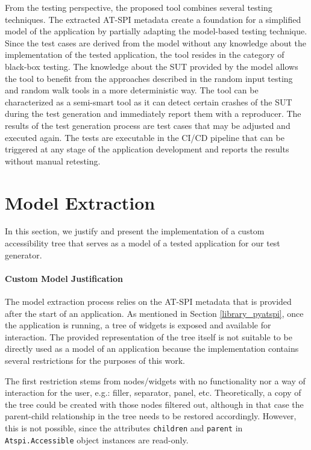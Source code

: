 From the testing perspective, the proposed tool combines several testing techniques. The extracted AT-SPI metadata create a foundation for a simplified model of the application by partially adapting the model-based testing technique. Since the test cases are derived from the model without any knowledge about the implementation of the tested application, the tool resides in the category of black-box testing. The knowledge about the SUT provided by the model allows the tool to benefit from the approaches described in the random input testing and random walk tools in a more deterministic way. The tool can be characterized as a semi-smart tool as it can detect certain crashes of the SUT during the test generation and immediately report them with a reproducer. The results of the test generation process are test cases that may be adjusted and executed again. The tests are executable in the CI/CD pipeline that can be triggered at any stage of the application development and reports the results without manual retesting.



\section{Model Extraction}\label{model}
 In this section, we justify and present the implementation of a custom accessibility tree that serves as a model of a tested application for our test generator. 
 
\paragraph{Custom Model Justification} The model extraction process relies on the AT-SPI metadata that is provided after the start of an application. As mentioned in Section \ref{library_pyatspi}, once the application is running, a tree of widgets is exposed and available for interaction. The provided representation of the tree itself is not suitable to be directly used as a model of an application because the implementation contains several restrictions for the purposes of this work.

The first restriction stems from nodes/widgets with no functionality nor a way of interaction for the user, e.g.: filler, separator, panel, etc. Theoretically, a copy of the tree could be created with those nodes filtered out, although in that case the parent-child relationship in the tree needs to be restored accordingly. However, this is not possible, since the attributes \texttt{children} and \texttt{parent} in \texttt{Atspi.Accessible} object instances are read-only. 

